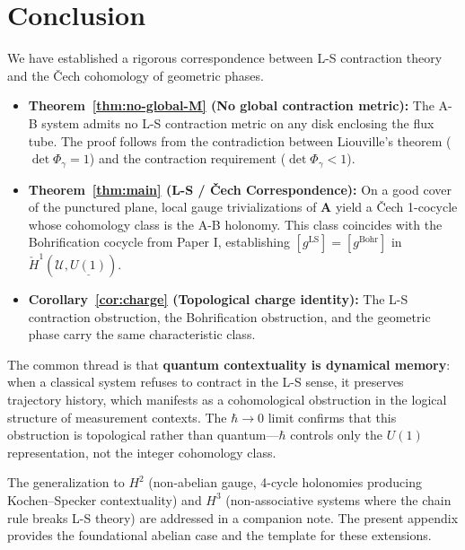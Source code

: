 \documentclass[11pt]{article}
\begin{document}
\section{Conclusion}
\label{sec:conclusion}

We have established a rigorous correspondence between L-S contraction theory
and the \v{C}ech cohomology of geometric phases.

\begin{itemize}
  \item \textbf{Theorem~\ref{thm:no-global-M} (No global contraction metric):}
    The A-B system admits no L-S contraction metric on any disk enclosing the
    flux tube. The proof follows from the contradiction between Liouville's
    theorem ($\det\Phi_\gamma = 1$) and the contraction requirement
    ($\det\Phi_\gamma < 1$).

  \item \textbf{Theorem~\ref{thm:main} (L-S / \v{C}ech Correspondence):}
    On a good cover of the punctured plane, local gauge trivializations of
    $\mathbf{A}$ yield a \v{C}ech 1-cocycle whose cohomology class is the
    A-B holonomy. This class coincides with the Bohrification cocycle from
    Paper I, establishing $[g^{\mathrm{LS}}] = [g^{\mathrm{Bohr}}]$ in
    $\check{H}^1(\mathcal{U}, \underline{U(1)})$.

  \item \textbf{Corollary~\ref{cor:charge} (Topological charge identity):}
    The L-S contraction obstruction, the Bohrification obstruction, and the
    geometric phase carry the same characteristic class.
\end{itemize}

The common thread is that \textbf{quantum contextuality is dynamical memory}:
when a classical system refuses to contract in the L-S sense, it preserves
trajectory history, which manifests as a cohomological obstruction in the
logical structure of measurement contexts. The $\hbar \to 0$ limit confirms
that this obstruction is topological rather than quantum---$\hbar$ controls
only the $U(1)$ representation, not the integer cohomology class.

The generalization to $H^2$ (non-abelian gauge, 4-cycle holonomies producing
Kochen--Specker contextuality) and $H^3$ (non-associative systems where the
chain rule breaks L-S theory) are addressed in a companion note. The present
appendix provides the foundational abelian case and the template for these
extensions.
\end{document}
